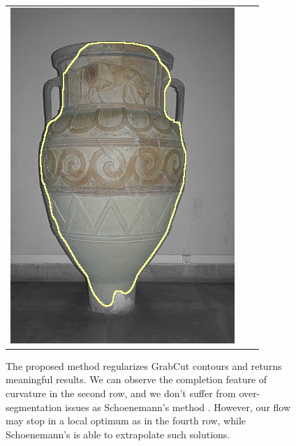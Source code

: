 \documentclass[smallextended]{svjour3}       %
\begin{document}
{{\begin{figure}[ht!]
\begin{tabular}{ccc}
		\includegraphics[scale=0.2]{segmentation_bc_vase_corrected-seg.png}		
	\end{tabular}
	\caption{The proposed method regularizes GrabCut \cite{rother04grabcut} contours and returns meaningful results. We can observe the completion feature of curvature in the second row, and we don't suffer from over-segmentation issues as Schoenemann's method \cite{schoenemann09linear}. However, our flow may stop in a local optimum as in the fourth row, while Schoenemann's is able to extrapolate such solutions.}
	\label{fig:segmentation-results}	
\end{figure}


}}
\end{document}
